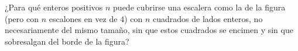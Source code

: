 ¿Para qué enteros positivos $n$ puede cubrirse una escalera como la de la figura (pero con $n$ escalones en vez de $4$) con $n$ cuadrados de lados enteros, no necesariamente del mismo tamaño, sin que estos cuadrados se encimen y sin que sobresalgan del borde de la figura?